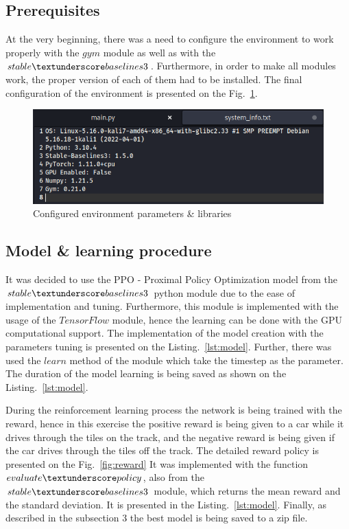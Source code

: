 \documentclass[runningheads]{llncs}
\begin{document}
\subsection{Prerequisites}
At the very beginning, there was a need to configure the environment to work properly with the $gym$ module as well as with the $stable\textunderscore baselines3$. Furthermore, in order to make all modules work, the proper version of each of them had to be installed. The final configuration of the environment is presented on the Fig.~\ref{fig:libraries}.
\begin{figure}
  \includegraphics[width=\textwidth]{Screenshots/libraries.png}
  \caption{Configured environment parameters \& libraries}
  \label{fig:libraries}
\end{figure}

\subsection{Model \& learning procedure}
It was decided to use the PPO - Proximal Policy Optimization model from the $stable\textunderscore baselines3$ python module due to the ease of implementation and tuning. Furthermore, this module is implemented with the usage of the $TensorFlow$ module, hence the learning can be done with the GPU computational support. The implementation of the model creation with the parameters tuning is presented on the Listing.~\ref{lst:model}. Further, there was used the $learn$ method of the module which take the timestep as the parameter. The duration of the model learning is being saved as shown on the Listing.~\ref{lst:model}.

During the reinforcement learning process the network is being trained with the reward, hence in this exercise the positive reward is being given to a car while it drives through the tiles on the track, and the negative reward is being given if the car drives through the tiles off the track. The detailed reward policy is presented on the Fig.~\ref{fig:reward} It was implemented with the function $evaluate\textunderscore policy$, also from the $stable\textunderscore baselines3$ module, which returns the mean reward and the standard deviation. It is presented in the Listing.~\ref{lst:model}. Finally, as described in the subsection 3 the best model is being saved to a zip file.
\end{document}
